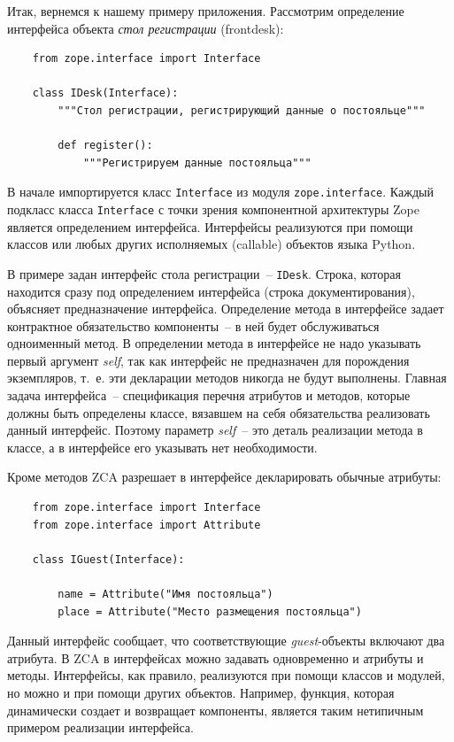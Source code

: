 \documentclass[a4paper,openany,twoside,final]{book}
\providecommand*{\DUroletitlereference}[1]{\textsl{#1}}
\begin{document}
Итак, вернемся к нашему примеру приложения.  Рассмотрим определение интерфейса объекта \DUroletitlereference{стол регистрации} (frontdesk):

\begin{verbatim}
    from zope.interface import Interface

    class IDesk(Interface):
        """Стол регистрации, регистрирующий данные о постояльце"""

        def register():
            """Регистрируем данные постояльца"""

\end{verbatim}

В начале импортируется класс \texttt{Interface} из модуля \texttt{zope.interface}.  Каждый подкласс класса \texttt{Interface} с точки зрения компонентной архитектуры Zope является определением интерфейса.  Интерфейсы реализуются при помощи классов или любых других исполняемых (callable) объектов языка Python.

В примере задан интерфейс стола регистрации~-- \texttt{IDesk}.  Строка, которая находится сразу под определением интерфейса (строка документирования), объясняет предназначение интерфейса.  Определение метода в интерфейсе задает контрактное обязательство компоненты~-- в ней будет обслуживаться одноименный метод.  В определении метода в интерфейсе не надо указывать первый аргумент \DUroletitlereference{self}, так как интерфейс не предназначен для порождения экземпляров, т.~е. эти декларации методов никогда не будут выполнены.  Главная задача интерфейса~-- спецификация перечня атрибутов и методов, которые должны быть определены классе, вязавшем на себя обязательства реализовать данный интерфейс.  Поэтому параметр \DUroletitlereference{self}~-- это деталь реализации метода в классе, а в интерфейсе его указывать нет необходимости.

Кроме методов ZCA разрешает в интерфейсе декларировать обычные атрибуты:

\begin{verbatim}
    from zope.interface import Interface
    from zope.interface import Attribute

    class IGuest(Interface):

        name = Attribute("Имя постояльца")
        place = Attribute("Место размещения постояльца")
\end{verbatim}

Данный интерфейс сообщает, что соответствующие \DUroletitlereference{guest}-объекты включают два атрибута.  В ZCA в интерфейсах можно задавать одновременно и атрибуты и методы.  Интерфейсы, как правило, реализуются при помощи классов и модулей, но можно и при помощи других объектов.  Например, функция, которая динамически создает и возвращает компоненты, является таким нетипичным примером реализации интерфейса.
\end{document}
